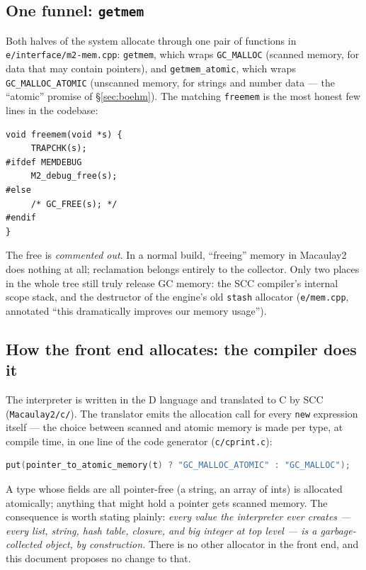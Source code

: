 \documentclass[11pt,oneside]{report}
\newcommand{\code}[1]{\textcolor{m2code}{\texttt{#1}}}
\newcommand{\file}[1]{\textcolor{m2file}{\texttt{#1}}}
\begin{document}
\subsection{One funnel: \code{getmem}}

Both halves of the system allocate through one pair of functions in
\file{e/interface/m2-mem.cpp}: \code{getmem}, which wraps \code{GC\_MALLOC}
(scanned memory, for data that may contain pointers), and
\code{getmem\_atomic}, which wraps \code{GC\_MALLOC\_ATOMIC} (unscanned
memory, for strings and number data --- the ``atomic'' promise of
\S\ref{sec:boehm}). The matching \code{freemem} is the most honest few lines
in the codebase:

\begin{lstlisting}
void freemem(void *s) {
     TRAPCHK(s);
#ifdef MEMDEBUG
     M2_debug_free(s);
#else
     /* GC_FREE(s); */
#endif
}
\end{lstlisting}

\noindent The free is \emph{commented out}. In a normal build, ``freeing''
memory in Macaulay2 does nothing at all; reclamation belongs entirely to the
collector. Only two places in the whole tree still truly release GC memory:
the SCC compiler's internal scope stack, and the destructor of the engine's
old \code{stash} allocator (\file{e/mem.cpp}, annotated ``this dramatically
improves our memory usage'').

\subsection{How the front end allocates: the compiler does it}

The interpreter is written in the D language and translated to C by SCC
(\file{Macaulay2/c/}). The translator emits the allocation call for every
\code{new} expression itself --- the choice between scanned and atomic memory
is made per type, at compile time, in one line of the code generator
(\file{c/cprint.c}):

\begin{lstlisting}[language=C]
put(pointer_to_atomic_memory(t) ? "GC_MALLOC_ATOMIC" : "GC_MALLOC");
\end{lstlisting}

\noindent A type whose fields are all pointer-free (a string, an array of
ints) is allocated atomically; anything that might hold a pointer gets
scanned memory. The consequence is worth stating plainly: \emph{every value
the interpreter ever creates --- every list, string, hash table, closure, and
big integer at top level --- is a garbage-collected object, by construction.}
There is no other allocator in the front end, and this document proposes no
change to that.
\end{document}
